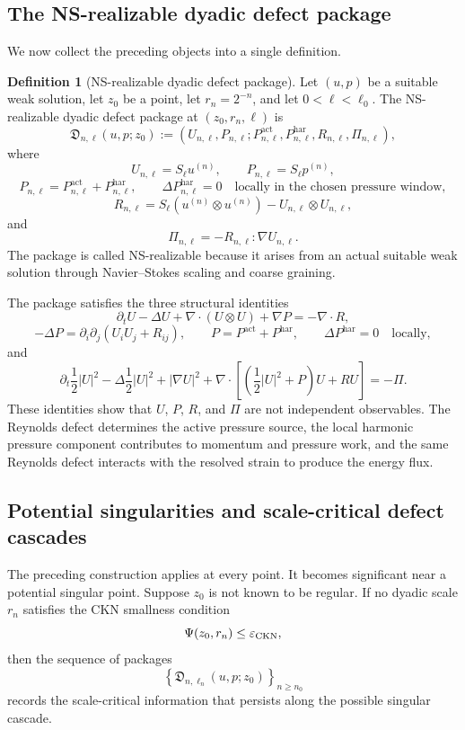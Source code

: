 \documentclass[11pt]{article}
\numberwithin{equation}{section}
\theoremstyle{plain}
\theoremstyle{definition}
\newtheorem{definition}[theorem]{Definition}
\theoremstyle{remark}
\newcommand{\eps}{\varepsilon}
\newcommand{\har}{\mathrm{har}}
\newcommand{\frakD}{\mathfrak D}
\newcommand{\act}{\mathrm{act}}
\begin{document}
\subsection{The NS-realizable dyadic defect package}

We now collect the preceding objects into a single definition.

\begin{definition}[NS-realizable dyadic defect package]
Let \((u,p)\) be a suitable weak solution, let \(z_0\) be a point, let \(r_n=2^{-n}\), and let \(0<\ell<\ell_0\).  The NS-realizable dyadic defect package at \((z_0,r_n,\ell)\) is
\[
  \frakD_{n,\ell}(u,p;z_0)
  :=
  \left(
  U_{n,\ell},
  P_{n,\ell};
  P^{\act}_{n,\ell},
  P^{\har}_{n,\ell},
  R_{n,\ell},
  \Pi_{n,\ell}
  \right),
\]
where
\[
  U_{n,\ell}=S_\ell u^{(n)},
  \qquad
  P_{n,\ell}=S_\ell p^{(n)},
\]
\[
  P_{n,\ell}=P^{\act}_{n,\ell}+P^{\har}_{n,\ell},
  \qquad
  \Delta P^{\har}_{n,\ell}=0
  \quad\text{locally in the chosen pressure window},
\]
\[
  R_{n,\ell}
  =
  S_\ell(u^{(n)}\otimes u^{(n)})
  -U_{n,\ell}\otimes U_{n,\ell},
\]
and
\[
  \Pi_{n,\ell}
  =
  -R_{n,\ell}:\nabla U_{n,\ell}.
\]
The package is called NS-realizable because it arises from an actual suitable weak solution through Navier--Stokes scaling and coarse graining.
\end{definition}

The package satisfies the three structural identities
\[
  \partial_t U-\Delta U+
  \nabla\cdot(U\otimes U)+\nabla P
  =
  -\nabla\cdot R,
\]
\[
  -\Delta P
  =
  \partial_i\partial_j(U_iU_j+R_{ij}),
  \qquad
  P=P^{\act}+P^{\har},
  \qquad
  \Delta P^{\har}=0
  \quad\text{locally},
\]
and
\[
  \partial_t\frac12|U|^2
  -\Delta\frac12|U|^2
  +|\nabla U|^2
  +
  \nabla\cdot\left[
    \left(\frac12|U|^2+P\right)U+RU
  \right]
  =
  -\Pi.
\]
These identities show that \(U\), \(P\), \(R\), and \(\Pi\) are not independent observables.  The Reynolds defect determines the active pressure source, the local harmonic pressure component contributes to momentum and pressure work, and the same Reynolds defect interacts with the resolved strain to produce the energy flux.
\subsection{Potential singularities and scale-critical defect cascades}

The preceding construction applies at every point.  It becomes significant near a potential singular point.  Suppose \(z_0\) is not known to be regular.  If no dyadic scale \(r_n\) satisfies the CKN smallness condition
\[
  \Psi(z_0,r_n)\le \eps_{\rm CKN},
\]
then the sequence of packages
\[
  \left\{\frakD_{n,\ell_n}(u,p;z_0)\right\}_{n\ge n_0}
\]
records the scale-critical information that persists along the possible singular cascade.
\end{document}
